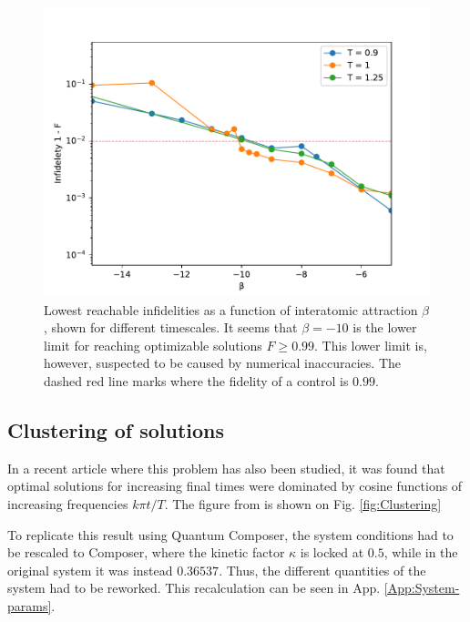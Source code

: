 \documentclass[a4paper, twocolumn]{revtex4-1}
\begin{document}
\begin{figure}
	\includegraphics[width=\columnwidth]{graphics/exploration/reachable_neg_beta.pdf}
	\caption{Lowest reachable infidelities as a function of interatomic attraction $\beta$, shown for different timescales. It seems that $\beta=-10$ is the lower limit for reaching optimizable solutions $F\geq0.99$. This lower limit is, however, suspected to be caused by numerical inaccuracies. The dashed red line marks where the fidelity of a control is $0.99$.}
	\label{fig:reachable_neg_betas}
\end{figure}

\subsection{\label{subsec:clustering}Clustering of solutions}

In a recent article where this problem has also been studied, it was found that optimal solutions for increasing final times were dominated by cosine functions of increasing frequencies $k\pi t/T$. The figure from \cite{QM2Paper} is shown on Fig. \ref{fig:Clustering}

To replicate this result using Quantum Composer, the system conditions had to be rescaled to Composer, where the kinetic factor $\kappa$ is locked at $0.5$, while in the original system it was instead $0.36537$. Thus, the different quantities of the system had to be reworked. This recalculation can be seen in App. \ref{App:System-params}. \\
\end{document}
